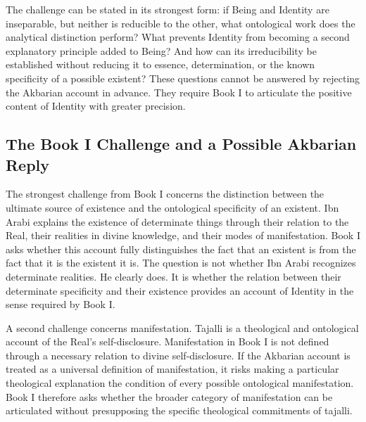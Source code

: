 \label{para:VS.B01.P01.C08.SS14.P004}

The challenge can be stated in its strongest
form: if Being and Identity are inseparable,
but neither is reducible to the other, what
ontological work does the analytical distinction
perform? What prevents Identity from becoming
a second explanatory principle added to Being?
And how can its irreducibility be established
without reducing it to essence, determination,
or the known specificity of a possible existent?
These questions cannot be answered by rejecting
the Akbarian account in advance. They require
Book I to articulate the positive content of
Identity with greater precision.



\subsection{The Book I Challenge and a Possible Akbarian Reply}
\label{subsec:ch08_s16_ss15}

\label{para:VS.B01.P01.C08.S16.SS15.P001}

The strongest challenge from Book I concerns
the distinction between the ultimate source
of existence and the ontological specificity
of an existent. Ibn Arabi explains the existence
of determinate things through their relation
to the Real, their realities in divine knowledge,
and their modes of manifestation. Book I asks
whether this account fully distinguishes
the fact that an existent is from the fact
that it is the existent it is. The question
is not whether Ibn Arabi recognizes determinate
realities. He clearly does. It is whether
the relation between their determinate
specificity and their existence provides
an account of Identity in the sense required
by Book I.

\label{para:VS.B01.P01.C08.SS15.P002}

A second challenge concerns manifestation.
Tajalli is a theological and ontological account
of the Real's self-disclosure. Manifestation
in Book I is not defined through a necessary
relation to divine self-disclosure. If the
Akbarian account is treated as a universal
definition of manifestation, it risks making
a particular theological explanation
the condition of every possible ontological
manifestation. Book I therefore asks whether
the broader category of manifestation can
be articulated without presupposing the
specific theological commitments of tajalli.

